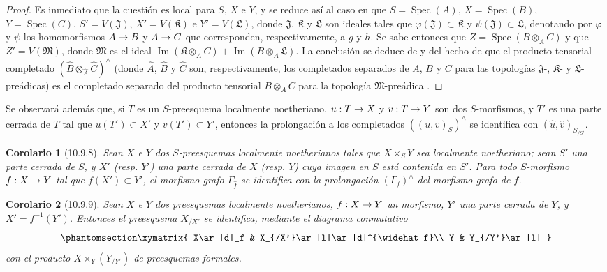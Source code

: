 \documentclass[oneside]{amsart}
\theoremstyle{ega-env-style}
\theoremstyle{ega-thm-env-style}
\newtheorem*{corollary}{Corolario}
\theoremstyle{ega-defn-env-style}
\renewcommand{\to}{\mathchoice{\longrightarrow}{\rightarrow}{\rightarrow}{\rightarrow}}
\let\EGAOriginalLabel\label
\renewcommand{\label}[1]{\phantomsection\EGAOriginalLabel{#1}}
\begin{document}
\begin{proof}
Es inmediato que la cuestión es local para $S$, $X$ e $Y$, y se reduce así al caso en que $S=\operatorname{Spec}(A)$, $X=\operatorname{Spec}(B)$, $Y=\operatorname{Spec}(C)$, $S'=V(\mathfrak{J})$, $X'=V(\mathfrak{K})$ e $Y'=V(\mathfrak{L})$, donde $\mathfrak{J}$, $\mathfrak{K}$ y $\mathfrak{L}$ son ideales tales que $\varphi(\mathfrak{J})\subset\mathfrak{K}$ y $\psi(\mathfrak{J})\subset\mathfrak{L}$, denotando por $\varphi$ y $\psi$ los homomorfismos $A\to B$ y $A\to C$ que corresponden, respectivamente, a $g$ y $h$.
Se sabe entonces que $Z=\operatorname{Spec}(B\otimes_A C)$ y que $Z'=V(\mathfrak{M})$, donde $\mathfrak{M}$ es el ideal $\operatorname{Im}(\mathfrak{K}\otimes_A C)
+\operatorname{Im}(B\otimes_A\mathfrak{L})$.
La conclusión se deduce de  y del hecho de que el producto tensorial completado $(\widehat B\otimes_{\widehat A}\widehat C)^\wedge$ (donde $\widehat A$, $\widehat B$ y $\widehat C$ son, respectivamente, los completados separados de $A$, $B$ y $C$ para las topologías $\mathfrak{J}$-, $\mathfrak{K}$- y $\mathfrak{L}$-preádicas) es el completado separado del producto tensorial $B\otimes_A C$ para la topología $\mathfrak{M}$-preádica .
\end{proof}

Se observará además que, si $T$ es un $S$-preesquema localmente noetheriano, $u:T\to X$ y $v:T\to Y$ son dos $S$-morfismos, y $T'$ es una parte cerrada de $T$ tal que $u(T')\subset X'$ y $v(T')\subset Y'$, entonces la prolongación a los completados $((u,v)_S)^\wedge$ se identifica con $(\widehat u,\widehat v)_{S_{/S'}}$.

\begin{corollary}[10.9.8]
\label{I.10.9.8}
Sean $X$ e $Y$ dos $S$-preesquemas localmente noetherianos tales que $X\times_S Y$ sea localmente noetheriano; sean $S'$ una parte cerrada de $S$, y $X'$ \textup{(resp. $Y'$)} una parte cerrada de $X$ \textup{(resp. $Y$)} cuya imagen en $S$ está contenida en $S'$.
Para todo $S$-morfismo $f:X\to Y$ tal que $f(X')\subset Y'$, el morfismo grafo $\Gamma_{\widehat f}$ se identifica con la prolongación $(\Gamma_f)^\wedge$ del morfismo grafo de $f$.
\end{corollary}

\begin{corollary}[10.9.9]
\label{I.10.9.9}
Sean $X$ e $Y$ dos preesquemas localmente noetherianos, $f:X\to Y$ un morfismo, $Y'$ una parte cerrada de $Y$, y $X'=f^{-1}(Y')$.
Entonces el preesquema $X_{/X'}$ se identifica, mediante el diagrama conmutativo
\[
  \label{I.10.9.9.1-fr}
  \xymatrix{
    X\ar[d]_f &
    X_{/X'}\ar[l]\ar[d]^{\widehat f}\\
    Y &
    Y_{/Y'}\ar[l]
  }
\]
con el producto $X\times_Y(Y_{/Y'})$ de preesquemas formales.
\end{corollary}
\end{document}
